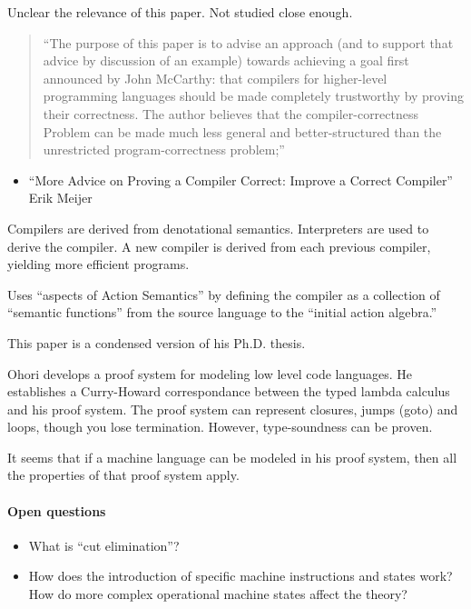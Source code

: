 \documentclass[11pt]{article}
\begin{document}



Unclear the relevance of this paper. Not studied close enough.

\begin{quote}
``The purpose of this paper is to advise an approach (and to support
that advice by discussion of an example) towards achieving a goal
first announced by John McCarthy: that compilers for higher-level
programming languages should be made completely trustworthy by proving
their correctness. The author believes that the compiler-correctness
Problem can be made much less general and better-structured than the
unrestricted program-correctness problem;''
\end{quote}

\begin{itemize}
\item ``More Advice on Proving a Compiler Correct: Improve a Correct Compiler''
Erik Meijer
\end{itemize}

Compilers are derived from denotational semantics. Interpreters are used to
derive the compiler. A new compiler is derived from each previous compiler, yielding
more efficient programs. 

Uses ``aspects of Action Semantics'' by defining the compiler as a collection of
``semantic functions'' from the source language to the ``initial action algebra.''

This paper is a condensed version of his Ph.D. thesis.


Ohori develops a proof system for modeling low level code
languages. He establishes a Curry-Howard correspondance between the
typed lambda calculus and his proof system. The proof system can represent
closures, jumps (goto) and loops, though you lose termination. However, type-soundness
can be proven. 

It seems that if a machine language can be modeled in his proof
system, then all the properties of that proof system apply.

\paragraph{Open questions}

\begin{itemize}
\item What is ``cut elimination''?
\item How does the introduction of specific machine instructions and states work? How do more
  complex operational machine states affect the theory?
\end{itemize}
\end{document}
